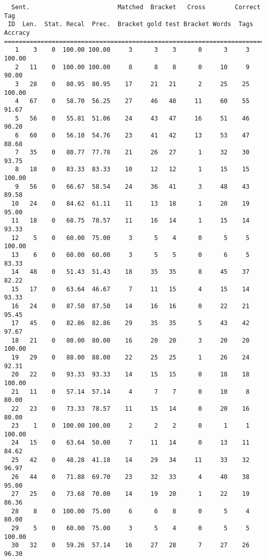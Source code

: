 \scriptsize
\begin{verbatim}
  Sent.                        Matched  Bracket   Cross        Correct Tag
 ID  Len.  Stat. Recal  Prec.  Bracket gold test Bracket Words  Tags Accracy
============================================================================
   1    3    0  100.00 100.00     3      3    3      0      3     3   100.00
   2   11    0  100.00 100.00     8      8    8      0     10     9    90.00
   3   28    0   80.95  80.95    17     21   21      2     25    25   100.00
   4   67    0   58.70  56.25    27     46   48     11     60    55    91.67
   5   56    0   55.81  51.06    24     43   47     16     51    46    90.20
   6   60    0   56.10  54.76    23     41   42     13     53    47    88.68
   7   35    0   80.77  77.78    21     26   27      1     32    30    93.75
   8   18    0   83.33  83.33    10     12   12      1     15    15   100.00
   9   56    0   66.67  58.54    24     36   41      3     48    43    89.58
  10   24    0   84.62  61.11    11     13   18      1     20    19    95.00
  11   18    0   68.75  78.57    11     16   14      1     15    14    93.33
  12    5    0   60.00  75.00     3      5    4      0      5     5   100.00
  13    6    0   60.00  60.00     3      5    5      0      6     5    83.33
  14   48    0   51.43  51.43    18     35   35      8     45    37    82.22
  15   17    0   63.64  46.67     7     11   15      4     15    14    93.33
  16   24    0   87.50  87.50    14     16   16      0     22    21    95.45
  17   45    0   82.86  82.86    29     35   35      5     43    42    97.67
  18   21    0   80.00  80.00    16     20   20      3     20    20   100.00
  19   29    0   88.00  88.00    22     25   25      1     26    24    92.31
  20   22    0   93.33  93.33    14     15   15      0     18    18   100.00
  21   11    0   57.14  57.14     4      7    7      0     10     8    80.00
  22   23    0   73.33  78.57    11     15   14      0     20    16    80.00
  23    1    0  100.00 100.00     2      2    2      0      1     1   100.00
  24   15    0   63.64  50.00     7     11   14      0     13    11    84.62
  25   42    0   48.28  41.18    14     29   34     11     33    32    96.97
  26   44    0   71.88  69.70    23     32   33      4     40    38    95.00
  27   25    0   73.68  70.00    14     19   20      1     22    19    86.36
  28    8    0  100.00  75.00     6      6    8      0      5     4    80.00
  29    5    0   60.00  75.00     3      5    4      0      5     5   100.00
  30   32    0   59.26  57.14    16     27   28      7     27    26    96.30

\end{verbatim}
